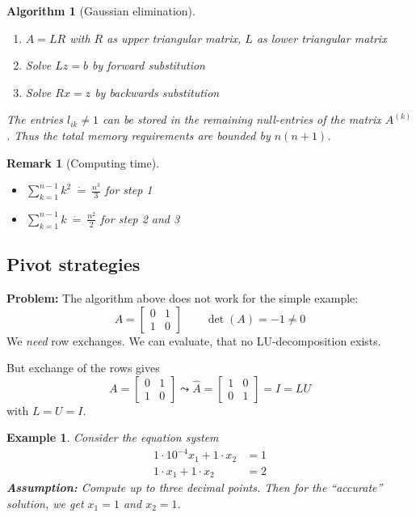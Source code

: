 \documentclass[a4paper]{article}
\newcounter{lecref}[section]
\numberwithin{lecref}{section}
\theoremstyle{break}
\newtheorem{example}[lecref]{Example}
\newtheorem*{Remark}{Remark}
\newtheorem{algorithm}{Algorithm}
\newcommand{\dotted}[1]{\:\dot{#1}\:}  %
\begin{document}
\begin{algorithm}[Gaussian elimination]\hfill{} %
  \begin{enumerate}
    \item $A = LR$ with $R$ as upper triangular matrix, $L$ as lower triangular matrix
    \item Solve $Lz = b$ by forward substitution
    \item Solve $Rx = z$ by backwards substitution
  \end{enumerate}
  The entries $l_{ik} \neq 1$ can be stored in the remaining null-entries of the matrix $A^{(k)}$.
  Thus the total memory requirements are bounded by $n (n+1)$.
\end{algorithm}

\begin{Remark}[Computing time]\hfill{}
  \begin{itemize}
    \item $\sum_{k=1}^{n-1} k^2 \dotted{=} \frac{n^3}{3}$ for step 1
    \item $\sum_{k=1}^{n-1} k \dotted{=} \frac{n^2}{2}$ for step 2 and 3
  \end{itemize}
\end{Remark}

\subsection{Pivot strategies}

\textbf{Problem:} The algorithm above does not work for the simple example:
\[ A = \begin{bmatrix} 0 & 1 \\ 1 & 0 \end{bmatrix} \qquad \det(A) = -1 \neq 0 \]
We \emph{need} row exchanges.
We can evaluate, that no LU-decomposition exists.

But exchange of the rows gives
\[
  A = \begin{bmatrix} 0 & 1 \\ 1 & 0 \end{bmatrix}
  \leadsto \hat{A} = \begin{bmatrix} 1 & 0 \\ 0 & 1 \end{bmatrix}
  = I = LU
\]
with $L = U = I$.

\begin{example} %
  Consider the equation system
  \begin{align*}
    1 \cdot 10^{-4} x_1 + 1 \cdot x_2 &= 1 \\
    1 \cdot x_1 + 1 \cdot x_2 &= 2
  \end{align*}
  \textbf{Assumption:} Compute up to three decimal points.
  Then for the \enquote{accurate} solution, we get $x_1 = 1$ and $x_2 = 1$.
\end{example}
\end{document}
